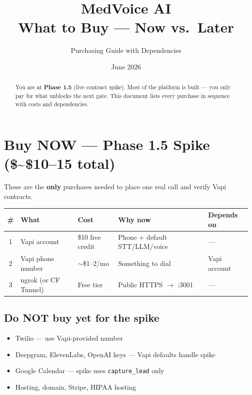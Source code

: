 \documentclass[11pt,a4paper]{article}
\title{MedVoice AI\\What to Buy --- Now vs.\ Later}
\author{Purchasing Guide with Dependencies}
\date{June 2026}
\begin{document}
\maketitle

\begin{abstract}
You are at \textbf{Phase 1.5} (live contract spike). Most of the platform is built --- you only pay for what unblocks the next gate. This document lists every purchase in sequence with costs and dependencies.
\end{abstract}

\tableofcontents
\newpage

\section{Buy NOW --- Phase 1.5 Spike (\$\sim\$10--15 total)}

These are the \textbf{only} purchases needed to place one real call and verify Vapi contracts.

\begin{center}
\small
\begin{tabular}{@{}cllll@{}}
\toprule
\textbf{\#} & \textbf{What} & \textbf{Cost} & \textbf{Why now} & \textbf{Depends on} \\
\midrule
1 & Vapi account & \$10 free credit & Phone + default STT/LLM/voice & --- \\
2 & Vapi phone number & $\sim$\$1--2/mo & Something to dial & Vapi account \\
3 & ngrok (or CF Tunnel) & Free tier & Public HTTPS $\rightarrow$ :3001 & --- \\
\bottomrule
\end{tabular}
\end{center}

\subsection{Do NOT buy yet for the spike}

\begin{itemize}[nosep]
  \item Twilio --- use Vapi-provided number
  \item Deepgram, ElevenLabs, OpenAI keys --- Vapi defaults handle spike
  \item Google Calendar --- spike uses \texttt{capture\_lead} only
  \item Hosting, domain, Stripe, HIPAA hosting
\end{itemize}
\end{document}
